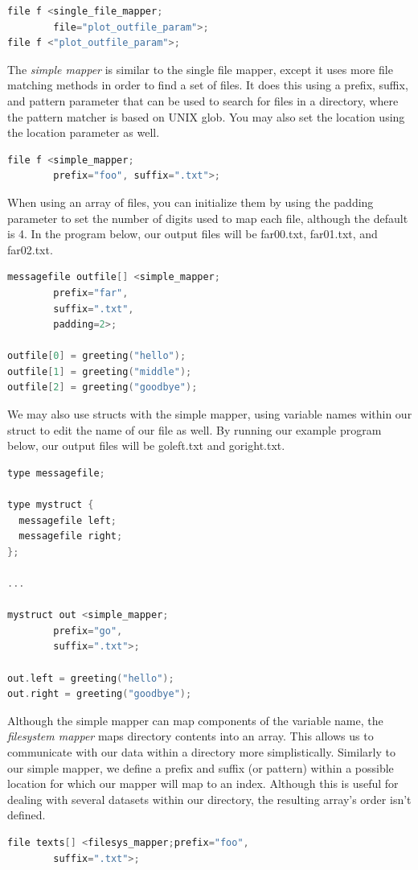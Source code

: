         \begin{lstlisting}[language=swift]
file f <single_file_mapper;
        file="plot_outfile_param">;
file f <"plot_outfile_param">;
        \end{lstlisting}

        The \textit{simple mapper} is similar to the single file mapper, except it uses more file matching methods in order to find a set of files. It does this using a prefix, suffix, and pattern parameter that can be used to search for files in a directory, where the pattern matcher is based on UNIX glob. You may also set the location using the location parameter as well.
        \begin{lstlisting}[language=swift]
file f <simple_mapper;
        prefix="foo", suffix=".txt">;
        \end{lstlisting}
        When using an array of files, you can initialize them by using the padding parameter to set the number of digits used to map each file, although the default is 4. In the program below, our output files will be far00.txt, far01.txt, and far02.txt.
        \begin{lstlisting}[language=swift]
messagefile outfile[] <simple_mapper;
        prefix="far",
        suffix=".txt",
        padding=2>;

outfile[0] = greeting("hello");
outfile[1] = greeting("middle");
outfile[2] = greeting("goodbye");
        \end{lstlisting}
        We may also use structs with the simple mapper, using variable names within our struct to edit the name of our file as well. By running our example program below, our output files will be goleft.txt and goright.txt.
        \begin{lstlisting}[language=swift]
type messagefile;

type mystruct {
  messagefile left;
  messagefile right;
};

...

mystruct out <simple_mapper;
        prefix="go",
        suffix=".txt">;

out.left = greeting("hello");
out.right = greeting("goodbye");
        \end{lstlisting}

        Although the simple mapper can map components of the variable name, the \textit{filesystem mapper} maps directory contents into an array. This allows us to communicate with our data within a directory more simplistically. Similarly to our simple mapper, we define a prefix and suffix (or pattern) within a possible location for which our mapper will map to an index. Although this is useful for dealing with several datasets within our directory, the resulting array's order isn't defined.
        \begin{lstlisting}[language=swift]
file texts[] <filesys_mapper;prefix="foo",
        suffix=".txt">;
        \end{lstlisting}

